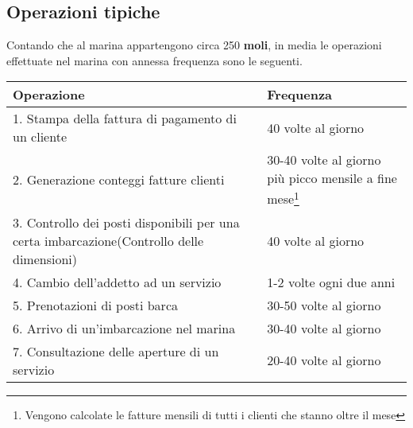 \subsection{Operazioni tipiche}
Contando che al marina appartengono circa 250 \textbf{moli}, in media le operazioni effettuate nel marina con annessa frequenza sono le seguenti.
\begin{center}
    \begin{tabularx}{\textwidth}{|p{90mm}|X|}
        \hline
        \rowcolor{gray!30}
        \textbf{Operazione} & \textbf{Frequenza}\\
        \hline
        1. Stampa della fattura di pagamento di un cliente & 40 volte al giorno\\

        \hline
        2. Generazione conteggi fatture clienti & 30-40 volte al giorno più picco mensile a fine mese\footnote{Vengono calcolate le fatture mensili di tutti i clienti che stanno oltre il mese}\\

        \hline
        3. Controllo dei posti disponibili per una certa imbarcazione(Controllo delle dimensioni)& 40 volte al giorno\\

        \hline
        4. Cambio dell'addetto ad un servizio & 1-2 volte ogni due anni\\

        \hline
        5. Prenotazioni di posti barca & 30-50 volte al giorno\\

        \hline
        6. Arrivo di un'imbarcazione nel marina & 30-40 volte al giorno\\

        \hline
        7. Consultazione delle aperture di un servizio & 20-40 volte al giorno\\

        \hline
    \end{tabularx}
\end{center}
